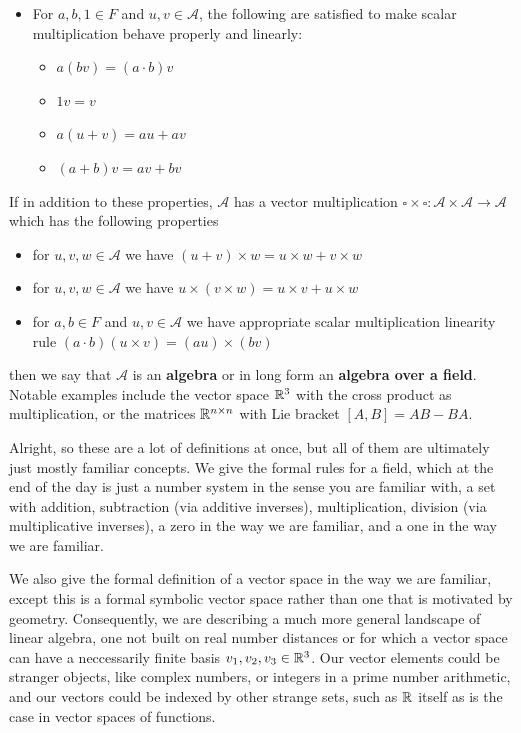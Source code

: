 \documentclass[11pt]{article}
\begin{document}
\begin{definition}
\begin{itemize}
\item For $a,b,1 \in F$ and $u,v \in \mathcal A$, the following are satisfied to make scalar multiplication behave properly and linearly: \begin{itemize}
\item $a(b v) = (a\cdot b) v$ 
\item $1 v = v$
\item $a(u + v) = au + av$
\item $(a + b)v = av + bv$
\end{itemize}
\end{itemize}
If in addition to these properties, $\mathcal A$ has a vector multiplication $\square \times \square \colon \mathcal A \times \mathcal A \to \mathcal A$ which has the following properties \begin{itemize}
\item for $u,v,w \in \mathcal A$ we have $(u + v) \times w = u \times w + v \times w$
\item for $u,v,w\in \mathcal A$ we have $u \times (v \times w) = u \times v + u \times w$
\item for $a,b \in F$ and $u,v\in \mathcal A$ we have appropriate scalar multiplication linearity rule $(a \cdot b)(u \times v) = (au) \times (b v)$
\end{itemize}
then we say that $\mathcal A$ is an \textbf{algebra} or in long form an \textbf{algebra over a field}. Notable examples include the vector space $\mathbb{R}^3$ with the cross product as multiplication, or the matrices $\mathbb{R}^{n \times n}$ with Lie bracket $[A,B] = AB - BA$.
\end{definition}

Alright, so these are a lot of definitions at once, but all of them are ultimately just mostly familiar concepts. We give the formal rules for a field, which at the end of the day is just a number system in the sense you are familiar with, a set with addition, subtraction (via additive inverses), multiplication, division (via multiplicative inverses), a zero in the way we are familiar, and a one in the way we are familiar.

We also give the formal definition of a vector space in the way we are familiar, except this is a formal symbolic vector space rather than one that is motivated by geometry. Consequently, we are describing a much more general landscape of linear algebra, one not built on real number distances or for which a vector space can have a neccessarily finite basis $v_1, v_2, v_3 \in \mathbb{R}^3$. Our vector elements could be stranger objects, like complex numbers, or integers in a prime number arithmetic, and our vectors could be indexed by other strange sets, such as $\mathbb{R}$ itself as is the case in vector spaces of functions.
\end{document}
